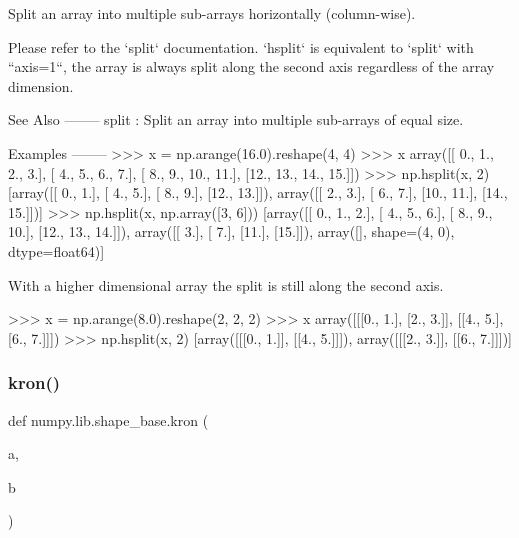 \begin{DoxyVerb}Split an array into multiple sub-arrays horizontally (column-wise).

Please refer to the `split` documentation.  `hsplit` is equivalent
to `split` with ``axis=1``, the array is always split along the second
axis regardless of the array dimension.

See Also
--------
split : Split an array into multiple sub-arrays of equal size.

Examples
--------
>>> x = np.arange(16.0).reshape(4, 4)
>>> x
array([[ 0.,   1.,   2.,   3.],
       [ 4.,   5.,   6.,   7.],
       [ 8.,   9.,  10.,  11.],
       [12.,  13.,  14.,  15.]])
>>> np.hsplit(x, 2)
[array([[  0.,   1.],
       [  4.,   5.],
       [  8.,   9.],
       [12.,  13.]]),
 array([[  2.,   3.],
       [  6.,   7.],
       [10.,  11.],
       [14.,  15.]])]
>>> np.hsplit(x, np.array([3, 6]))
[array([[ 0.,   1.,   2.],
       [ 4.,   5.,   6.],
       [ 8.,   9.,  10.],
       [12.,  13.,  14.]]),
 array([[ 3.],
       [ 7.],
       [11.],
       [15.]]),
 array([], shape=(4, 0), dtype=float64)]

With a higher dimensional array the split is still along the second axis.

>>> x = np.arange(8.0).reshape(2, 2, 2)
>>> x
array([[[0.,  1.],
        [2.,  3.]],
       [[4.,  5.],
        [6.,  7.]]])
>>> np.hsplit(x, 2)
[array([[[0.,  1.]],
       [[4.,  5.]]]),
 array([[[2.,  3.]],
       [[6.,  7.]]])]\end{DoxyVerb}
 \mbox{\label{namespacenumpy_1_1lib_1_1shape__base_af6e6226bca1c5438f27665971f916196}} 
\subsubsection{\texorpdfstring{kron()}{kron()}}
{\footnotesize\ttfamily def numpy.\+lib.\+shape\+\_\+base.\+kron (\begin{DoxyParamCaption}\item[{}]{a,  }\item[{}]{b }\end{DoxyParamCaption})}

